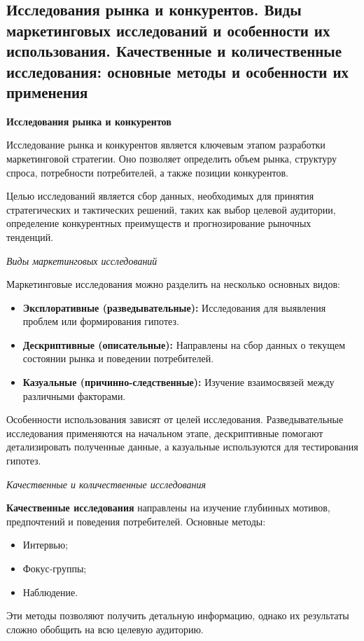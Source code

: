 \pagebreak

\subsection{Исследования рынка и конкурентов. Виды маркетинговых исследований и особенности их использования. Качественные и количественные исследования: основные методы и особенности их применения}

\textbf{Исследования рынка и конкурентов}

Исследование рынка и конкурентов является ключевым этапом разработки маркетинговой стратегии. Оно позволяет определить объем рынка, структуру спроса, потребности потребителей, а также позиции конкурентов.

Целью исследований является сбор данных, необходимых для принятия стратегических и тактических решений, таких как выбор целевой аудитории, определение конкурентных преимуществ и прогнозирование рыночных тенденций.

\textit{Виды маркетинговых исследований}

Маркетинговые исследования можно разделить на несколько основных видов:
\begin{itemize}
    \item \textbf{Эксплоративные (разведывательные):} Исследования для выявления проблем или формирования гипотез.
    \item \textbf{Дескриптивные (описательные):} Направлены на сбор данных о текущем состоянии рынка и поведении потребителей.
    \item \textbf{Казуальные (причинно-следственные):} Изучение взаимосвязей между различными факторами.
\end{itemize}

Особенности использования зависят от целей исследования. Разведывательные исследования применяются на начальном этапе, дескриптивные помогают детализировать полученные данные, а казуальные используются для тестирования гипотез.

\textit{Качественные и количественные исследования}

\textbf{Качественные исследования} направлены на изучение глубинных мотивов, предпочтений и поведения потребителей. Основные методы:
\begin{itemize}
    \item Интервью;
    \item Фокус-группы;
    \item Наблюдение.
\end{itemize}
Эти методы позволяют получить детальную информацию, однако их результаты сложно обобщить на всю целевую аудиторию.

